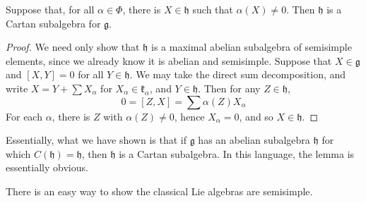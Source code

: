 \begin{lemma}
    Suppose that, for all $\alpha \in \Phi$, there is $X \in \mathfrak{h}$ such that $\alpha(X) \neq 0$. Then $\mathfrak{h}$ is a Cartan subalgebra for $\mathfrak{g}$.
\end{lemma}
\begin{proof}
    We need only show that $\mathfrak{h}$ is a maximal abelian subalgebra of semisimple elements, since we already know it is abelian and semisimple. Suppose that $X \in \mathfrak{g}$ and $[X,Y] = 0$ for all $Y \in \mathfrak{h}$. We may take the direct sum decomposition, and write $X = Y + \sum X_\alpha$ for $X_\alpha \in \mathfrak{k}_\alpha$, and $Y \in \mathfrak{h}$. Then for any $Z \in \mathfrak{h}$,
    \[ 0 = [Z,X] = \sum \alpha(Z) X_\alpha \]
    For each $\alpha$, there is $Z$ with $\alpha(Z) \neq 0$, hence $X_\alpha = 0$, and so $X \in \mathfrak{h}$.
\end{proof}

Essentially, what we have shown is that if $\mathfrak{g}$ has an abelian subalgebra $\mathfrak{h}$ for which $C(\mathfrak{h}) = \mathfrak{h}$, then $\mathfrak{h}$ is a Cartan subalgebra. In this language, the lemma is essentially obvious.

There is an easy way to show the classical Lie algebras are semisimple.

